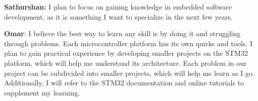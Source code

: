 \begin{enumerate}
  \textbf{Sathurshan:} I plan to focus on gaining knowledge in embedded software
  development, as it is something I want to specialize in the next few years.

  \textbf{Omar}: I believe the best way to learn any skill is by doing it and
  struggling through problems. Each microcontroller platform has its own quirks 
  and tools. I plan to gain practical experience by developing smaller 
  projects on the STM32 platform, which will help me understand its architecture.
  Each problem in our project can be subdivided into smaller projects, which 
  will help me learn as I go. Additionally, I will refer to the STM32 
  documentation and online tutorials to supplement my learning.

\end{enumerate}
